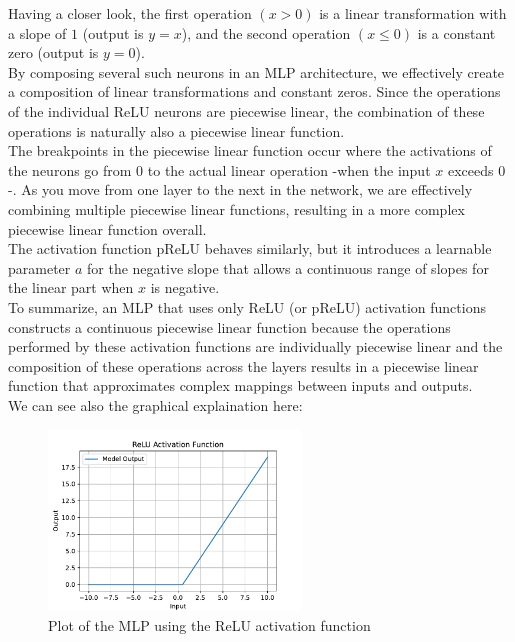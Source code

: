 Having a closer look, the first operation $(x > 0)$ is a linear transformation with a slope of $1$ (output is $y = x$), and the second operation $(x \leq 0)$ is a constant zero (output is $y = 0$).\\

By composing several such neurons in an MLP architecture, we effectively create a composition of linear transformations and constant zeros. Since the operations of the individual ReLU neurons are piecewise linear, the combination of these operations is naturally also a piecewise linear function.\\
The breakpoints in the piecewise linear function occur where the activations of the neurons go from $0$ to the actual linear operation -when the input $x$ exceeds $0$ -. As you move from one layer to the next in the network, we are effectively combining multiple piecewise linear functions, resulting in a more complex piecewise linear function overall.\\

The activation function pReLU behaves similarly, but it introduces a learnable parameter $a$ for the negative slope that allows a continuous range of slopes for the linear part when $x$ is negative.\\

To summarize, an MLP that uses only ReLU (or pReLU) activation functions constructs a continuous piecewise linear function because the operations performed by these activation functions are individually piecewise linear and the composition of these operations across the layers results in a piecewise linear function that approximates complex mappings between inputs and outputs.\\

We can see also the graphical explaination  here:
\begin{figure}[h]
	\centering
	\includegraphics[width=0.6\textwidth]{../Problem 7/MLP_ReLU_plot.pdf}
	\caption{Plot of the MLP using the ReLU activation function}
\end{figure}

 


